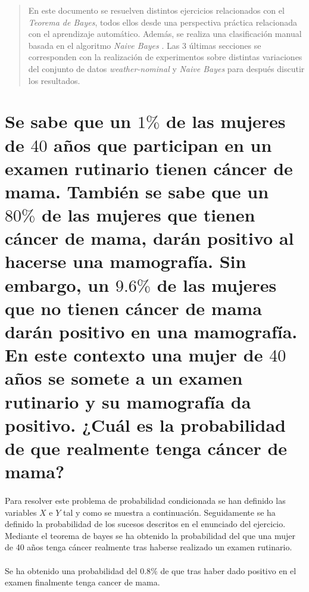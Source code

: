 \documentclass{article}
\begin{document}
	\maketitle %

	\thispagestyle{fancy} %



	\begin{abstract}
		\noindent En este documento se resuelven distintos ejercicios relacionados con el \emph{Teorema de Bayes}, todos ellos desde una perspectiva práctica relacionada con el aprendizaje automático. Además, se realiza una clasificación manual basada en el algoritmo \emph{Naive Bayes} \cite{john1995estimating}. Las 3 últimas secciones se corresponden con la realización de experimentos sobre distintas variaciones del conjunto de datos \emph{weather-nominal} \cite{dataset:weather} y \emph{Naive Bayes} para después discutir los resultados.
	\end{abstract}



	\section{Se sabe que un $1\%$ de las mujeres de $40$ años que participan en un examen rutinario tienen cáncer de mama. También se sabe que un $80\%$ de las mujeres que tienen cáncer de mama, darán positivo al hacerse una mamografía. Sin embargo, un $9.6\%$ de las mujeres que no tienen cáncer de mama darán positivo en una mamografía. En este contexto una mujer de $40$ años se somete a un examen rutinario y su mamografía da positivo. ¿Cuál es la probabilidad de que realmente tenga cáncer de mama?}
	\label{sec:e1}

		\paragraph{}
		Para resolver este problema de probabilidad condicionada se han definido las variables $X$ e $Y$ tal y como se muestra a continuación. Seguidamente se ha definido la probabilidad de los sucesos descritos en el enunciado del ejercicio. Mediante el teorema de bayes se ha obtenido la probabilidad del que una mujer de 40 años tenga cáncer realmente tras haberse realizado un examen rutinario.

		\paragraph{}
		Se ha obtenido una probabilidad del \textbf{$0.8\%$} de que tras haber dado positivo en el examen finalmente tenga cancer de mama.
\end{document}

